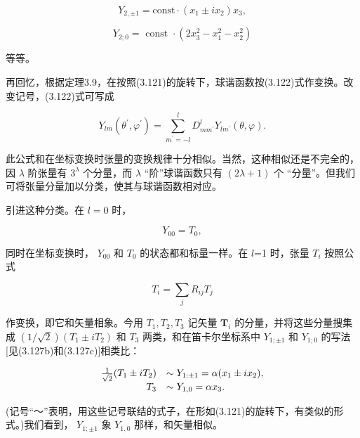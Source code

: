 \begin{equation*}
Y _ {2, \pm 1} = \mathrm{const} \cdot (x _ {1} \pm i x _ {2}) x _ {3},\tag{3.127e}
\end{equation*}

\begin{equation*}
Y _ {2; 0} = \text { const } \cdot (2 x _ {3} ^ {2} - x _ {1} ^ {2} - x _ {2} ^ {2})\tag{3.127f}
\end{equation*}

等等。

再回忆，根据定理3.9，在按照(3.121)的旋转下，球谐函数按(3.122)式作变换。改变记号，(3.122)式可写成

\begin{equation*}
Y _ {l m} \left(\theta^ {\prime}, \varphi^ {\prime}\right) = \sum_ {m ^ {\prime} = - l} ^ {l} D _ {m m ^ {\prime}} ^ {l} Y _ {l m ^ {\prime}} (\theta , \varphi).\tag{3.128}
\end{equation*}

此公式和在坐标变换时张量的变换规律十分相似。当然，这种相似还是不完全的，因 $\lambda$ 阶张量有 $3^{\lambda}$ 个分量，而 $\lambda$ “阶”球谐函数只有 $(2\lambda+1)$ 个 “分量”。但我们可将张量分量加以分类，使其与球谐函数相对应。

引进这种分类。在 $l = 0$ 时，

\begin{equation*}
Y _ {0 0} = T _ {0},
\end{equation*}

同时在坐标变换时， $Y_{00}$ 和 $T_{0}$ 的状态都和标量一样。在 $l$=1 时，张量 $T_{i}$ 按照公式

\begin{equation*}
T _ {i} = \sum_ {j} R _ {i j} T _ {j}
\end{equation*}

作变换，即它和矢量相象。今用 $T_{1}, T_{2}, T_{3}$ 记矢量 $\pmb{T}_{i}$ 的分量，并将这些分量搜集成 $(1 / \sqrt{2})(T_{1} \pm iT_{2})$ 和 $T_{3}$ 两类，和在笛卡尔坐标系中 $Y_{1; \pm 1}$ 和 $Y_{1;0}$ 的写法[见(3.127b)和(3.127c)]相类比：

\begin{equation*}
\begin{array}{r l} \frac {1}{\sqrt {2}} (T _ {1} \pm i T _ {2}) & \sim Y _ {1: \pm 1} = \alpha (x _ {1} \pm i x _ {2}), \\ T _ {3} & \sim Y _ {1, 0} = \alpha x _ {3}. \end{array}
\end{equation*}

(记号“～”表明，用这些记号联结的式子，在形如(3.121)的旋转下，有类似的形式。)我们看到， $Y_{1;\pm1}$ 象 $Y_{1,0}$ 那样，和矢量相似。

